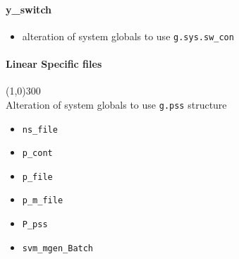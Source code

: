 \documentclass[12pt]{article}
\begin{document}
\paragraph{y\_switch}
	\begin{itemize}
		\item alteration of system globals to use \verb|g.sys.sw_con|
	\end{itemize}
	
	
\paragraph{Linear Specific files}\line(1,0){300} \ \\


Alteration of system globals to use \verb|g.pss| structure
	\begin{itemize}
		\item \verb|ns_file|
		\item \verb|p_cont|
		\item \verb|p_file|
		\item \verb|p_m_file|
		\item \verb|P_pss|
		\item \verb|svm_mgen_Batch|
	\end{itemize}
	
\end{document}
